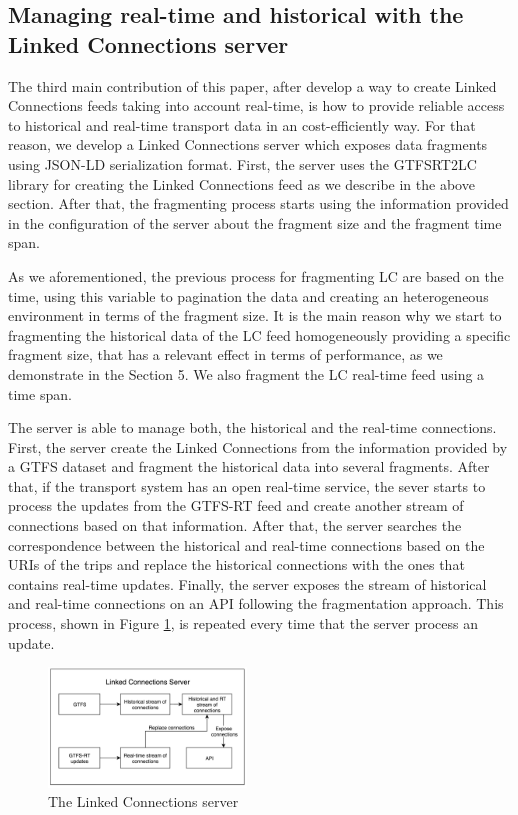 \documentclass[sw]{iosart2x}
\begin{document}
\subsection{Managing real-time and historical with the Linked Connections server}
The third main contribution of this paper, after develop a way to create Linked Connections feeds taking into account real-time, is how to provide reliable access to historical and real-time transport data in an cost-efficiently way. For that reason, we develop a Linked Connections server which exposes data fragments using JSON-LD serialization format. First, the server uses the GTFSRT2LC library for creating the Linked Connections feed as we describe in the above section. After that, the fragmenting process starts using the information provided in the configuration of the server about the fragment size and the fragment time span. 

As we aforementioned, the previous process for fragmenting LC are based on the time, using this variable to pagination the data and creating an heterogeneous environment in terms of the fragment size. It is the main reason why we start to fragmenting the historical data of the LC feed homogeneously providing a specific fragment size, that has a relevant effect in terms of performance, as we demonstrate in the Section 5. We also fragment the LC real-time feed using a time span. 

The server is able to manage both, the historical and the real-time connections. First, the server create the Linked Connections from the information provided by a GTFS dataset and fragment the historical data into several fragments. After that, if the transport system has an open real-time service, the sever starts to process the updates from the GTFS-RT feed and create another stream of connections based on that information. After that, the server searches the correspondence between the historical and real-time connections based on the URIs of the trips and replace the historical connections with the ones that contains real-time updates. Finally, the server exposes the stream of historical and real-time connections on an API following the fragmentation approach. This process, shown in Figure \ref{fig:lc_server}, is repeated every time that the server process an update.

\begin{figure}[t]
	\includegraphics[width=0.47\textwidth]{images/lc_server.png}
	\caption{The Linked Connections server}\label{fig:lc_server}
\end{figure}
\end{document}
